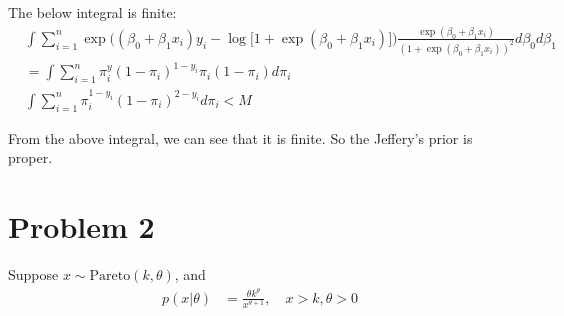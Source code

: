 \begin{itemize}
The below integral is finite:
\begin{align*}
& \int  \sum_{i=1}^ n \exp \Big(  (\beta_0 + \beta_1 x_i) y_i -\log \Big[ 1 + \exp(\beta_0 + \beta_1 x_i) \Big] \Big) \frac{\exp(\beta_0 + \beta_1 x_i)}{(1 + \exp(\beta_0+ \beta_1 x_i))^2} d\beta_0 d\beta_1   \\
&= \int  \sum_{i=1}^ n  \pi_i^{y} (1- \pi_i)^{1-y_i} \pi_i (1-\pi_i) d\pi_i \\
& \int  \sum_{i=1}^ n  \pi_i^{1- y_i} (1- \pi_i)^{2-y_i}  d\pi_i < M
\end{align*}

From the above integral, we can see that it is finite. So the Jeffery's prior is proper. 

\end{itemize}


\section{Problem 2}

Suppose $x \sim \text{Pareto} (k, \theta)$, and 
\begin{align}
   p(x | \theta) &= \frac{\theta k^{\theta}}{x^{\theta + 1}}, \quad x > k, \theta > 0\\
   \label{eq:1}
\end{align}

